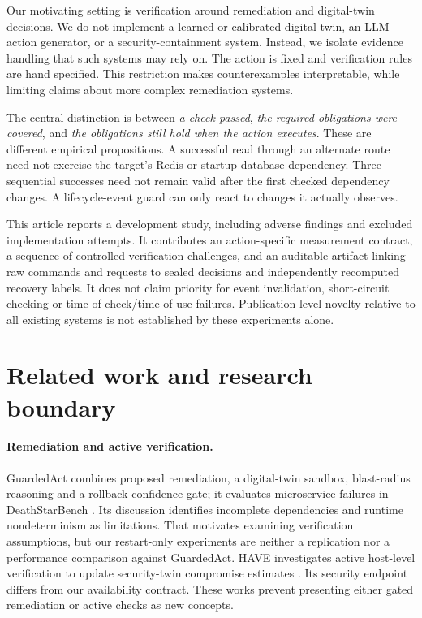 \documentclass[manuscript,review,nonacm]{acmart}
\begin{document}
Our motivating setting is verification around remediation and digital-twin decisions. We do not implement a learned or calibrated digital twin, an LLM action generator, or a security-containment system. Instead, we isolate evidence handling that such systems may rely on. The action is fixed and verification rules are hand specified. This restriction makes counterexamples interpretable, while limiting claims about more complex remediation systems.

The central distinction is between \emph{a check passed}, \emph{the required obligations were covered}, and \emph{the obligations still hold when the action executes}. These are different empirical propositions. A successful read through an alternate route need not exercise the target's Redis or startup database dependency. Three sequential successes need not remain valid after the first checked dependency changes. A lifecycle-event guard can only react to changes it actually observes.

This article reports a development study, including adverse findings and excluded implementation attempts. It contributes an action-specific measurement contract, a sequence of controlled verification challenges, and an auditable artifact linking raw commands and requests to sealed decisions and independently recomputed recovery labels. It does not claim priority for event invalidation, short-circuit checking or time-of-check/time-of-use failures. Publication-level novelty relative to all existing systems is not established by these experiments alone.

\section{Related work and research boundary}
\paragraph{Remediation and active verification.}
GuardedAct combines proposed remediation, a digital-twin sandbox, blast-radius reasoning and a rollback-confidence gate; it evaluates microservice failures in DeathStarBench \cite{guarded}. Its discussion identifies incomplete dependencies and runtime nondeterminism as limitations. That motivates examining verification assumptions, but our restart-only experiments are neither a replication nor a performance comparison against GuardedAct. HAVE investigates active host-level verification to update security-twin compromise estimates \cite{have}. Its security endpoint differs from our availability contract. These works prevent presenting either gated remediation or active checks as new concepts.
\end{document}
